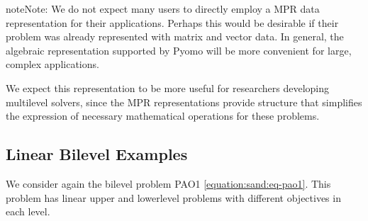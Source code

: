 \documentclass[letterpaper,10pt,english]{sphinxmanual}
\begin{document}
\begin{sphinxadmonition}{note}{Note:}
We do not expect many users to directly employ a MPR data
representation for their applications.  Perhaps this would be
desirable if their problem was already represented with matrix and
vector data.  In general, the algebraic representation supported by
Pyomo will be more convenient for large, complex applications.

We expect this representation to be more useful for researchers
developing multilevel solvers, since the MPR representations provide
structure that simplifies the expression of necessary mathematical
operations for these problems.
\end{sphinxadmonition}


\subsection{Linear Bilevel Examples}
\label{\detokenize{representations/mpr:linear-bilevel-examples}}
We consider again the bilevel problem PAO1 \eqref{equation:sand:eq-pao1}.  This problem
has linear upper\sphinxhyphen{} and lower\sphinxhyphen{}level problems with different objectives
in each level.
\end{document}
